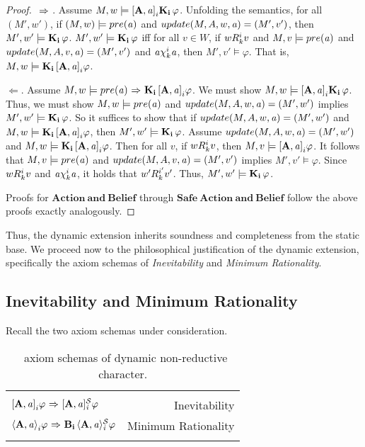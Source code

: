 \begin{proof}
${\ \Rightarrow \ }$. Assume $M,w \models \mathbf{[A,\mathit{a}]}_i\mathbf{K}_{\mathbf{i}}\,\varphi$. Unfolding the semantics, for all $(M',w')$, if $(M,w)\models pre(\mathit{a})$ and $update(M,A,w,\mathit{a})=(M',v')$, then $M',w'\models\mathbf{K}_{\mathbf{i}}\,\varphi$. $M',w'\models \mathbf{K}_{\mathbf{i}}\,\varphi$ iff for all $v\in W$, if $wR_{k}^iv$ and $M,v\models pre(\mathit{a})$ and $update(M,A,v,\mathit{a})=(M',v')$ and  $\mathit{a}\chi_{k}^i\mathit{a}$, then $M',v'\models\varphi$. That is, $M,w\models \mathbf{K}_{\mathbf{i}}\,\mathbf{[A,\mathit{a}]}_i\varphi$. 

$\Leftarrow$. Assume $M,w \models pre(\mathit{a}) {\ \Rightarrow \ } \mathbf{K}_{\mathbf{i}}\,\mathbf{[A,\mathit{a}]}_i\varphi$. We must show $M,w \models \mathbf{[A,\mathit{a}]}_i\mathbf{K}_{\mathbf{i}}\,\varphi$. Thus, we must show $M,w \models pre(\mathit{a})$ and $update(M,A,w,\mathit{a})=(M',w')$ implies $M',w' \models \mathbf{K}_{\mathbf{i}}\,\varphi$. So it suffices to show that if $update(M,A,w,\mathit{a})=(M',w')$ and $M,w\models \mathbf{K}_{\mathbf{i}}\,\mathbf{[A,\mathit{a}]}_i\varphi$, then $M',w'\models \mathbf{K}_{\mathbf{i}}\,\varphi$. Assume $update(M,A,w,\mathit{a})=(M',w')$ and $M,w\models\mathbf{K}_{\mathbf{i}}\,\mathbf{[A,\mathit{a}]}_i\varphi$. Then for all $v$, if $wR_{k}^iv$, then $M,v\models\mathbf{[A,\mathit{a}]}_i\varphi$. It follows that $M,v\models pre(\mathit{a})$ and $update(M,A,v,\mathit{a})=(M',v')$ implies $M',v'\models\varphi$. Since $wR_{k}^iv$ and $\mathit{a}\chi_{k}^i\mathit{a}$, it holds that $w'R_{k}^{i'}v'$. Thus, $M',w'\models\mathbf{K}_{\mathbf{i}}\,\varphi$.

Proofs for $\mathbf{Action\ and\ Belief}$ through $\mathbf{Safe\ Action\ and\ Belief}$ follow the above proofs exactly analogously.

\end{proof}

Thus, the dynamic extension inherits soundness and completeness from the static base. We proceed now to the philosophical justification of the dynamic extension, specifically the axiom schemas of \emph{Inevitability} and \emph{Minimum Rationality}.

\subsection{Inevitability and Minimum Rationality}\label{sec:dyn_ext}

Recall the two axiom schemas under consideration.
\begin{table}[H]
	\begin{center}
		\begin{tabular}{| l r |}
			\hline 
&\\
$\mathbf{[A,\mathit{a}]}_i\varphi {\ \Rightarrow \ } \mathbf{[A,\mathit{a}]_{\mathit{i}}^\mathcal{S}}\varphi$ & Inevitability\\
$\mathbf{\langle A,\mathit{a}\rangle}_i\varphi {\ \Rightarrow \ } \mathbf{B}_{\mathbf{i}}\,\mathbf{\langle A,\mathit{a}\rangle_{\mathit{i}}^\mathcal{S}}\varphi$ & Minimum Rationality\\ & \\
\hline
\end{tabular}
\caption{\DASL\ axiom schemas of dynamic non-reductive character.}
\end{center}
\end{table}

